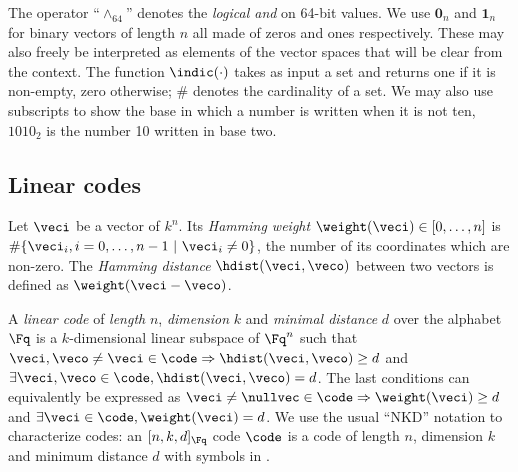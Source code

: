 The operator ``$\wedge_{64}$'' denotes the  \emph{logical and} on 64-bit values. We use $\mathbf{0}_{n}$ and $\mathbf{1}_n$ for binary vectors of length $n$ all made of
zeros and ones respectively. These may also freely be interpreted as elements of the vector spaces that will be clear from the context.
The function $\indic(\cdot)$ takes as input a set and returns one if it is non-empty, zero otherwise; $\#$ denotes the cardinality of a set.
We may also use subscripts to show the base in which a number is written when it is not ten, \eg $1010_2$ is the number 10 written in base two.



\subsection{Linear codes}

\begin{defi}
Let $\veci$ be a vector of $k^n$. Its \emph{Hamming weight} $\weight(\veci) \in [0,\ldots,n]$ is $\#\{\veci_i, i = 0,\ldots,n-1~|~ \veci_i \neq 0\}$,
the number of its coordinates which are non-zero.
The \emph{Hamming distance} $\hdist(\veci,\veco)$ between two vectors is defined as $\weight(\veci - \veco)$.
\end{defi}


\begin{defi}
\label{def:lincode}
A \emph{linear code} of \emph{length} $n$, \emph{dimension} $k$ and \emph{minimal distance} $d$ over the alphabet $\Fq$ is a $k$-dimensional linear subspace of $\Fq^n$ such that
$\veci, \veco \neq \veci \in \code \Rightarrow \hdist(\veci, \veco) \geq d$
and $\exists \veci, \veco \in \code,  \hdist(\veci, \veco) = d$.
The last conditions can equivalently be expressed as $\veci \neq \nullvec \in \code \Rightarrow \weight(\veci) \geq d$ and $\exists \veci \in \code, \weight(\veci) = d$.
We use the usual ``NKD'' notation to characterize codes: an $[n, k, d]_{\Fq}$ code $\code$ is a code of length $n$, dimension $k$ and minimum distance $d$
with symbols in \Fq.
\end{defi}

